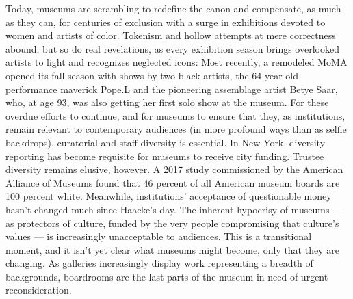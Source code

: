 Today, museums are scrambling to redefine the canon and compensate, as
much as they can, for centuries of exclusion with a surge in exhibitions
devoted to women and artists of color. Tokenism and hollow attempts at
mere correctness abound, but so do real revelations, as every exhibition
season brings overlooked artists to light and recognizes neglected
icons: Most recently, a remodeled MoMA opened its fall season with shows
by two black artists, the 64-year-old performance maverick
\href{https://www.nytimes3xbfgragh.onion/2018/03/02/t-magazine/pope-l-artist.html}{Pope.L}
and the pioneering assemblage artist
\href{https://www.nytimes3xbfgragh.onion/2019/09/04/arts/design/betye-saar.html}{Betye
Saar}, who, at age 93, was also getting her first solo show at the
museum. For these overdue efforts to continue, and for museums to ensure
that they, as institutions, remain relevant to contemporary audiences
(in more profound ways than as selfie backdrops), curatorial and staff
diversity is essential. In New York, diversity reporting has become
requisite for museums to receive city funding. Trustee diversity remains
elusive, however. A
\href{https://www.aam-us.org/2018/01/19/museum-board-leadership-2017-a-national-report/}{2017
study} commissioned by the American Alliance of Museums found that 46
percent of all American museum boards are 100 percent white. Meanwhile,
institutions' acceptance of questionable money hasn't changed much since
Haacke's day. The inherent hypocrisy of museums --- as protectors of
culture, funded by the very people compromising that culture's values
--- is increasingly unacceptable to audiences. This is a transitional
moment, and it isn't yet clear what museums might become, only that they
are changing. As galleries increasingly display work representing a
breadth of backgrounds, boardrooms are the last parts of the museum in
need of urgent reconsideration.


